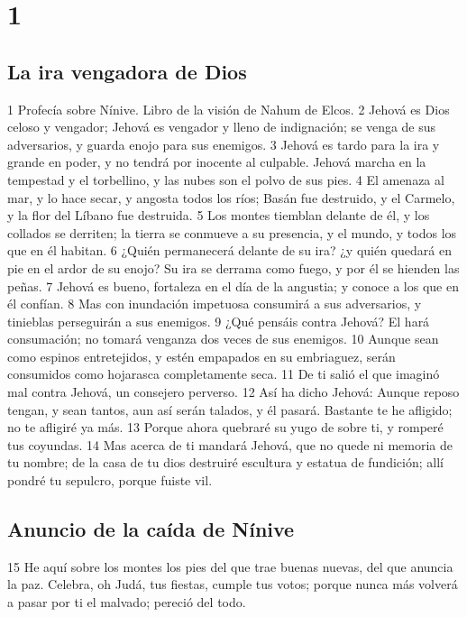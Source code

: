 
\chapter{1}

\section*{La ira vengadora de Dios}

1 Profecía sobre Nínive. Libro de la visión de Nahum de Elcos.
2 Jehová es Dios celoso y vengador; Jehová es vengador y lleno de indignación; se venga de sus adversarios, y guarda enojo para sus enemigos.
3 Jehová es tardo para la ira y grande en poder, y no tendrá por inocente al culpable. Jehová marcha en la tempestad y el torbellino, y las nubes son el polvo de sus pies.
4 El amenaza al mar, y lo hace secar, y angosta todos los ríos; Basán fue destruido, y el Carmelo, y la flor del Líbano fue destruida.
5 Los montes tiemblan delante de él, y los collados se derriten; la tierra se conmueve a su presencia, y el mundo, y todos los que en él habitan.
6 ¿Quién permanecerá delante de su ira? ¿y quién quedará en pie en el ardor de su enojo? Su ira se derrama como fuego, y por él se hienden las peñas.
7 Jehová es bueno, fortaleza en el día de la angustia; y conoce a los que en él confían.
8 Mas con inundación impetuosa consumirá a sus adversarios, y tinieblas perseguirán a sus enemigos.
9 ¿Qué pensáis contra Jehová? El hará consumación; no tomará venganza dos veces de sus enemigos.
10 Aunque sean como espinos entretejidos, y estén empapados en su embriaguez, serán consumidos como hojarasca completamente seca.
11 De ti salió el que imaginó mal contra Jehová, un consejero perverso.
12 Así ha dicho Jehová: Aunque reposo tengan, y sean tantos, aun así serán talados, y él pasará. Bastante te he afligido; no te afligiré ya más.
13 Porque ahora quebraré su yugo de sobre ti, y romperé tus coyundas.
14 Mas acerca de ti mandará Jehová, que no quede ni memoria de tu nombre; de la casa de tu dios destruiré escultura y estatua de fundición; allí pondré tu sepulcro, porque fuiste vil.

\section*{Anuncio de la caída de Nínive}

15 He aquí sobre los montes los pies del que trae buenas nuevas, del que anuncia la paz. Celebra, oh Judá, tus fiestas, cumple tus votos; porque nunca más volverá a pasar por ti el malvado; pereció del todo.


